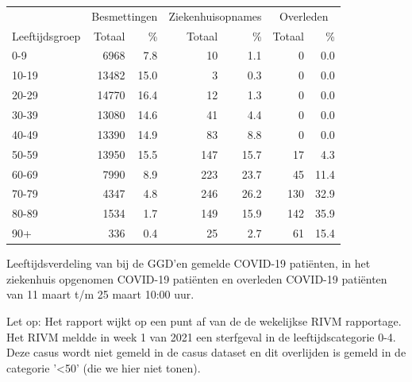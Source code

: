 \documentclass[
  english,
  man,floatsintext]{apa6}
\begin{document}
\begin{table}
\centering\begingroup\fontsize{11}{13}\selectfont

\begin{threeparttable}
\begin{tabular}{lrrrrrr}
\toprule
\multicolumn{1}{c}{ } & \multicolumn{2}{c}{Besmettingen} & \multicolumn{2}{c}{Ziekenhuisopnames} & \multicolumn{2}{c}{Overleden} \\
\cmidrule(l{3pt}r{3pt}){2-3} \cmidrule(l{3pt}r{3pt}){4-5} \cmidrule(l{3pt}r{3pt}){6-7}
Leeftijdsgroep & Totaal & \% & Totaal & \% & Totaal & \%\\
\midrule
0-9 & 6968 & 7.8 & 10 & 1.1 & 0 & 0.0\\
10-19 & 13482 & 15.0 & 3 & 0.3 & 0 & 0.0\\
20-29 & 14770 & 16.4 & 12 & 1.3 & 0 & 0.0\\
30-39 & 13080 & 14.6 & 41 & 4.4 & 0 & 0.0\\
40-49 & 13390 & 14.9 & 83 & 8.8 & 0 & 0.0\\
50-59 & 13950 & 15.5 & 147 & 15.7 & 17 & 4.3\\
60-69 & 7990 & 8.9 & 223 & 23.7 & 45 & 11.4\\
70-79 & 4347 & 4.8 & 246 & 26.2 & 130 & 32.9\\
80-89 & 1534 & 1.7 & 149 & 15.9 & 142 & 35.9\\
90+ & 336 & 0.4 & 25 & 2.7 & 61 & 15.4\\
\bottomrule
\end{tabular}
\begin{tablenotes}
\item[1] Leeftijdsverdeling van bij de GGD’en gemelde COVID-19 patiënten, in het ziekenhuis opgenomen COVID-19 patiënten en overleden COVID-19 patiënten van 11 maart t/m 25 maart 10:00 uur.
\item[2] Let op: Het rapport wijkt op een punt af van de de wekelijkse RIVM rapportage. Het RIVM meldde in week 1 van 2021 een sterfgeval in de leeftijdscategorie 0-4. Deze casus wordt niet gemeld in de casus dataset en dit overlijden is gemeld in de categorie '<50' (die we hier niet tonen).
\end{tablenotes}
\end{threeparttable}
\endgroup{}
\end{table}

\newpage
\end{document}
